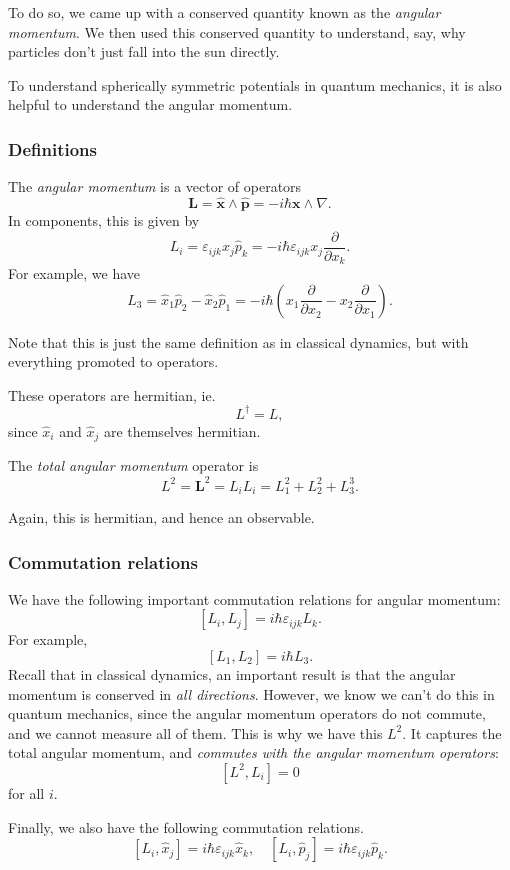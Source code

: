 \documentclass[a4paper]{article}
\begin{document}
To do so, we came up with a conserved quantity known as the \emph{angular momentum}. We then used this conserved quantity to understand, say, why particles don't just fall into the sun directly.

To understand spherically symmetric potentials in quantum mechanics, it is also helpful to understand the angular momentum.
\subsubsection*{Definitions}

\begin{defi}
  The \emph{angular momentum} is a vector of operators
  \[
    \mathbf{L} = \hat{\mathbf{x}}\wedge \hat{\mathbf{p}} = -i\hbar \mathbf{x} \wedge \nabla.
  \]
  In components, this is given by
  \[
    L_i = \varepsilon_{ijk} \hat{x}_j\hat{p}_k = -i\hbar \varepsilon_{ijk} x_j \frac{\partial}{\partial x_k}.
  \]
  For example, we have
  \[
    L_3 = \hat{x}_1 \hat{p}_2 - \hat{x}_2 \hat{p}_1 = -i\hbar \left(x_1 \frac{\partial}{\partial x_2} - x_2 \frac{\partial}{\partial x_1}\right).
  \]
\end{defi}
Note that this is just the same definition as in classical dynamics, but with everything promoted to operators.

These operators are hermitian, ie.
\[
  L^\dagger = L,
\]
since $\hat{x}_i$ and $\hat{x}_j$ are themselves hermitian.

\begin{defi}
  The \emph{total angular momentum} operator is
  \[
    L^2 = \mathbf{L}^2 = L_i L_i = L_1^2 + L_2^2 + L_3^3.
  \]
\end{defi}
Again, this is hermitian, and hence an observable.

\subsubsection*{Commutation relations}
We have the following important commutation relations for angular momentum:
\[
  [L_i, L_j] = i\hbar \varepsilon_{ijk} L_k.
\]
For example,
\[
  [L_1, L_2] = i\hbar L_3.
\]
Recall that in classical dynamics, an important result is that the angular momentum is conserved in \emph{all directions}. However, we know we can't do this in quantum mechanics, since the angular momentum operators do not commute, and we cannot measure all of them. This is why we have this $L^2$. It captures the total angular momentum, and \emph{commutes with the angular momentum operators}:
\[
  [L^2, L_i] = 0
\]
for all $i$.

Finally, we also have the following commutation relations.
\[
  [L_i, \hat{x}_j] = i\hbar \varepsilon_{ijk} \hat{x}_k,\quad [L_i, \hat{p}_j] = i\hbar \varepsilon_{ijk} \hat{p}_k.
\]
\end{document}
